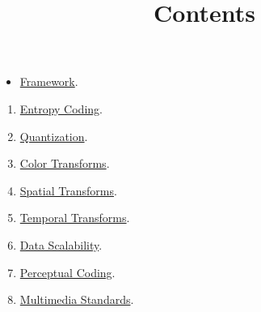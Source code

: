

\title{\SM{} \newline Contents}

\maketitle

\begin{itemize}
\item \href{https://sistemas-multimedia.github.io/study_guide/contents/provisioning}{Framework}.
\end{itemize}
\begin{enumerate}
\item \href{https://sistemas-multimedia.github.io/study_guide/contents/entropy_coding}{Entropy Coding}.
\item \href{https://sistemas-multimedia.github.io/study_guide/contents/quantization}{Quantization}.
\item \href{https://sistemas-multimedia.github.io/study_guide/contents/color_transforms}{Color Transforms}.
\item \href{https://sistemas-multimedia.github.io/study_guide/contents/spatial_transforms}{Spatial Transforms}.
\item \href{https://sistemas-multimedia.github.io/study_guide/contents/temporal_transforms}{Temporal Transforms}.
\item \href{https://sistemas-multimedia.github.io/study_guide/contents/data_scalability}{Data Scalability}.
\item \href{https://sistemas-multimedia.github.io/study_guide/contents/perceptual_coding}{Perceptual Coding}.
\item \href{https://sistemas-multimedia.github.io/study_guide/contents/standards}{Multimedia Standards}.
\end{enumerate}


